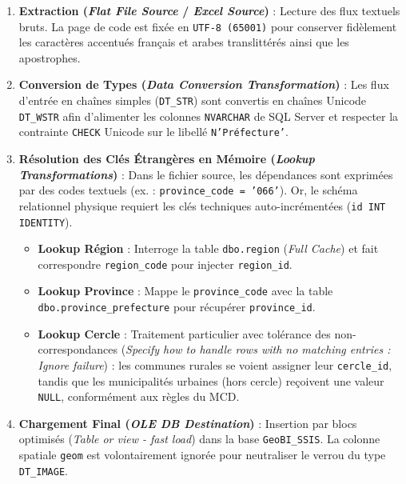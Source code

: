 \documentclass[12pt,a4paper]{article}
\begin{document}
\begin{enumerate}[leftmargin=1.2cm]
    \item \textbf{Extraction (\textit{Flat File Source} / \textit{Excel Source})} :
    Lecture des flux textuels bruts. La page de code est fixée en \texttt{UTF-8 (65001)} pour conserver fidèlement les caractères accentués français et arabes translittérés ainsi que les apostrophes.
    
    \item \textbf{Conversion de Types (\textit{Data Conversion Transformation})} :
    Les flux d'entrée en chaînes simples (\texttt{DT\_STR}) sont convertis en chaînes Unicode \texttt{DT\_WSTR} afin d'alimenter les colonnes \texttt{NVARCHAR} de SQL Server et respecter la contrainte \texttt{CHECK} Unicode sur le libellé \texttt{N'Préfecture'}.
    
    \item \textbf{Résolution des Clés Étrangères en Mémoire (\textit{Lookup Transformations})} :
    Dans le fichier source, les dépendances sont exprimées par des codes textuels (ex. : \texttt{province\_code = '066'}). Or, le schéma relationnel physique requiert les clés techniques auto-incrémentées (\texttt{id INT IDENTITY}).
    \begin{itemize}
        \item \textbf{Lookup Région} : Interroge la table \texttt{dbo.region} (\textit{Full Cache}) et fait correspondre \texttt{region\_code} pour injecter \texttt{region\_id}.
        \item \textbf{Lookup Province} : Mappe le \texttt{province\_code} avec la table \texttt{dbo.province\_prefecture} pour récupérer \texttt{province\_id}.
        \item \textbf{Lookup Cercle} : Traitement particulier avec tolérance des non-correspondances (\textit{Specify how to handle rows with no matching entries : Ignore failure}) : les communes rurales se voient assigner leur \texttt{cercle\_id}, tandis que les municipalités urbaines (hors cercle) reçoivent une valeur \texttt{NULL}, conformément aux règles du MCD.
    \end{itemize}
    
    \item \textbf{Chargement Final (\textit{OLE DB Destination})} :
    Insertion par blocs optimisés (\textit{Table or view - fast load}) dans la base \texttt{GeoBI\_SSIS}. La colonne spatiale \texttt{geom} est volontairement ignorée pour neutraliser le verrou du type \texttt{DT\_IMAGE}.
\end{enumerate}
\end{document}
